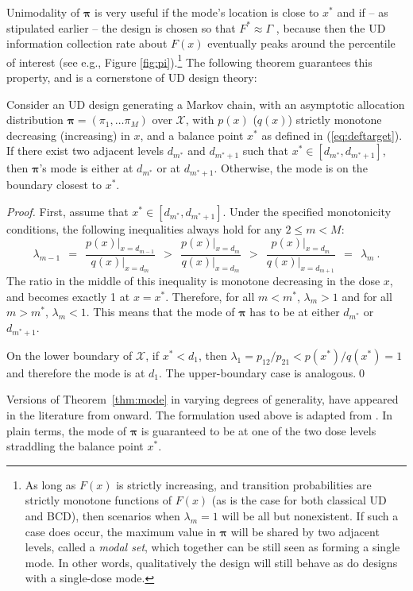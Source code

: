 Unimodality of $\boldsymbol{\pi}$ is very useful if the mode's location is close to $x^*$ and if -- as stipulated earlier -- the design is chosen so that $F^*\approx\Gamma$ , because then the UD information collection rate about $F(x)$ eventually peaks around the percentile of interest (see e.g., Figure \ref{fig:pi}).\footnote{As long as $F(x)$ is strictly increasing, and transition probabilities are strictly monotone functions of $F(x)$ (as is the case for both classical UD and BCD), then scenarios when $\lambda_m=1$ will be all but nonexistent. If such a case does occur, the maximum value in $\boldsymbol{\pi}$ will be shared by two adjacent levels, called a \emph{modal set}, which together can be still seen as forming a single mode. In other words, qualitatively the design will still behave as do designs with a single-dose mode.} The following theorem guarantees this property, and is a cornerstone of UD design theory:
%
\begin{thm}\label{thm:mode} Consider an UD design generating a Markov chain, with an asymptotic allocation distribution $\boldsymbol{\pi}=\left(\pi_1,\ldots \pi_M\right)$ over $\mathcal{X}$, with $p(x)$ ($q(x)$) strictly monotone decreasing (increasing) in $x$, and a balance point $x^*$ as defined in (\ref{eq:deftarget}). If there exist two adjacent levels $d_{m^*}$ and $d_{m^*+1}$ such that $x^*\in\left[d_{m^*},d_{m^*+1}\right]$, then $\boldsymbol{\pi}$'s mode is either at $d_{m^*}$ or at $d_{m^*+1}$. Otherwise, the mode is on the boundary closest to $x^*$.
\end{thm}
%
\begin{proof} First, assume that $x^*\in\left[d_{m^*},d_{m^*+1}\right]$. Under the specified monotonicity conditions, the following inequalities always hold for any $2\leq m<M$:
%
\begin{equation}\label{eq:gammas1}
\lambda_{m-1}\ \ =\ \ \frac{p(x)\big |_{x=d_{m-1}}}{q(x)\big |_{x=d_m}}\ \ >\ \ \frac{p(x)\big |_{x=d_m}}{q(x)\big |_{x=d_{m}}}\ \ >\ \ \frac{p(x)\big |_{x=d_m}}{q(x)\big |_{x=d_{m+1}}}\ \ =\ \ \lambda_m\ .
\end{equation}
\noindent The ratio in the middle of this inequality is monotone decreasing in the dose $x$, and becomes exactly 1 at $x=x^*$. Therefore, for all $m<m^*$, $\lambda_m>1$ and for all $m>m^*$, $\lambda_m<1$. This means that the mode of $\boldsymbol{\pi}$ has to be at either $d_{m^*}$ or $d_{m^*+1}$.

\noindent On the lower boundary of $\mathcal{X}$, if $x^*<d_1$, then $\lambda_1=p_{12}/p_{21}<p\left(x^*\right)/q\left(x^*\right)=1$ and therefore the mode is at $d_1$. The upper-boundary case is analogous.\qed\end{proof}
%
Versions of Theorem~\ref{thm:mode} in varying degrees of generality, have appeared in the literature from \cite{Derm:Nonp:1957} onward. The formulation used above is adapted from \cite{Oron:Hoff:thek:2009}. In plain terms, the mode of $\boldsymbol{\pi}$ is guaranteed to be at one of the two dose levels straddling the balance point $x^*$.

